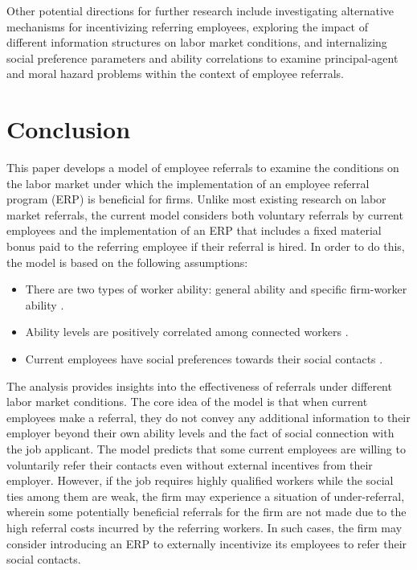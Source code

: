 \documentclass[12pt]{article}
\begin{document}
Other potential directions for further research include investigating alternative mechanisms for incentivizing referring employees, exploring the impact of different information structures on labor market conditions, and internalizing social preference parameters and ability correlations to examine principal-agent and moral hazard problems within the context of employee referrals.

\section{Conclusion} \label{sec:conclusion}

This paper develops a model of employee referrals to examine the conditions on the labor market under which the implementation of an employee referral program (ERP) is beneficial for firms. Unlike most existing research on labor market referrals, the current model considers both voluntary referrals by current employees and the implementation of an ERP that includes a fixed material bonus paid to the referring employee if their referral is hired. In order to do this, the model is based on the following assumptions:
\begin{itemize}
    \item There are two types of worker ability: general ability and specific firm-worker ability \citep{becker1962investment, becker1975investment, gibbons2004task, lazear2009firm}. 
    \item Ability levels are positively correlated among connected workers \citep{montgomery1991social}.
    \item Current employees have social preferences towards their social contacts \citep{bandiera2009social, friebel2023employee}.
\end{itemize}

The analysis provides insights into the effectiveness of referrals under different labor market conditions. The core idea of the model is that when current employees make a referral, they do not convey any additional information to their employer beyond their own ability levels and the fact of social connection with the job applicant. The model predicts that some current employees are willing to voluntarily refer their contacts even without external incentives from their employer. However, if the job requires highly qualified workers while the social ties among them are weak, the firm may experience a situation of under-referral, wherein some potentially beneficial referrals for the firm are not made due to the high referral costs incurred by the referring workers. In such cases, the firm may consider introducing an ERP to externally incentivize its employees to refer their social contacts.
\end{document}
